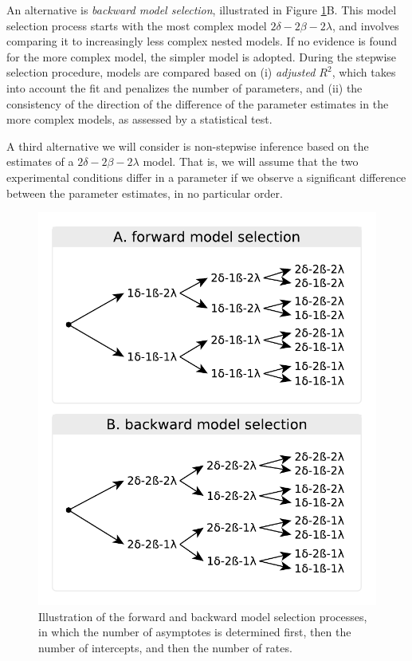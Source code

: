 \documentclass[10pt,letterpaper]{article}
\begin{document}
An alternative is \textit{backward model selection}, illustrated in Figure \ref{fig:model_selection}B. This model selection process starts with the most complex model \(2\delta-2\beta-2\lambda\), and involves comparing it to increasingly less complex nested models. If no evidence is found for the more complex model, the simpler model is adopted.
During the stepwise selection procedure, models are compared based on (i) \textit{adjusted \(R^2\)}, which takes into account the fit and penalizes the number of parameters, and (ii) the consistency of the direction of the difference of the parameter estimates in the more complex models, as assessed by a statistical test. 

A third alternative we will consider is non-stepwise inference based on the estimates of a \(2\delta-2\beta-2\lambda\) model. That is, we will assume that the two experimental conditions differ in a parameter if we observe a significant difference between the parameter estimates, in no particular order.

\begin{figure}[t]
\centering
\includegraphics[width=.75\columnwidth]{../figures/illustrations/decision_algo.pdf} %
\caption{\label{fig:model_selection}Illustration of the forward and backward model selection processes, in which the number of asymptotes is determined first, then the number of intercepts, and then the number of rates.}
\end{figure}
\end{document}
